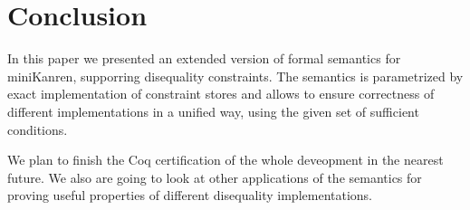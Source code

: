 \section{Conclusion}

In this paper we presented an extended version of formal semantics for miniKanren, supporring disequality constraints.
The semantics is parametrized by exact implementation of constraint stores and allows to ensure correctness of different implementations in a unified way, using the given set of sufficient conditions.

We plan to finish the Coq certification of the whole deveopment in the nearest future.
We also are going to look at other applications of the semantics for proving useful properties of different disequality implementations.
